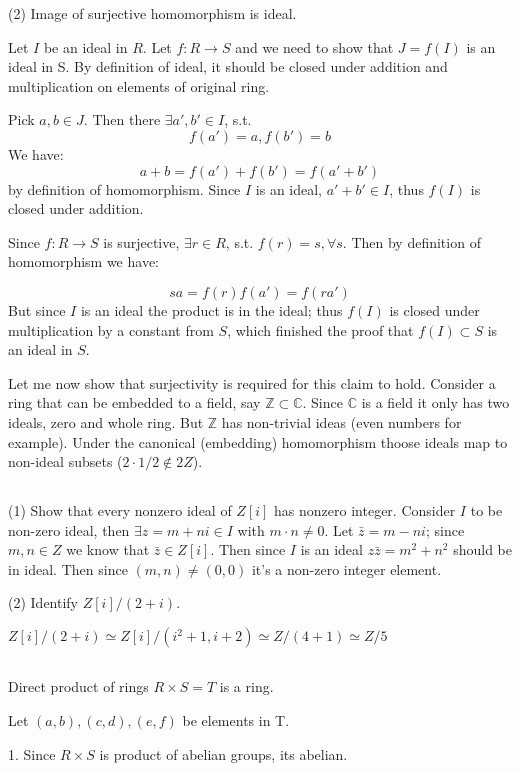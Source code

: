 \documentclass{amsart}
\def\Z{\mathbb{Z}}
\def\C{\mathbb{C}}
\begin{document}
(2) Image of surjective homomorphism is ideal.

Let $I$ be an ideal in $R$. Let $f: R \to S$ and we need to show that $J = f(I)$ is an ideal in S. By definition of ideal, it should be closed under addition and multiplication on elements of original ring.

Pick $a, b \in J$. Then there $\exists a', b' \in I$, s.t.
$$ f(a') = a, f(b') = b$$
We have:
$$a+b = f(a') + f(b') = f(a' +b')$$
by definition of homomorphism. Since $I$ is an ideal, $a' + b' \in I$, thus $f(I)$ is closed under addition.

Since $f: R \to S$ is surjective, $\exists r \in R$, s.t. $f(r) = s, \forall s$. Then by definition of homomorphism we have:

$$
    sa = f(r) f(a') = f(ra')
$$
But since $I$ is an ideal the product is in the ideal; thus $f(I)$ is closed under multiplication by a constant from $S$, which finished the proof that $f(I) \subset S$ is an ideal in $S$.

Let me now show that surjectivity is required for this claim to hold. Consider a ring that can be embedded to a field, say $\Z \subset \C$. Since $\C$ is a field it only has two ideals, zero and whole ring. But $\Z$ has non-trivial ideas (even numbers for example). Under the canonical (embedding) homomorphism thoose ideals map to non-ideal subsets ($2 \cdot 1/2 \notin 2Z$).

\subsection{} 
(1) Show that every nonzero ideal of $Z[i]$ has nonzero integer.
Consider $I$ to be non-zero ideal, then $\exists z = m + ni \in I$ with $m\cdot n \neq 0$. Let $\bar{z} = m-ni$; since $m,n \in Z$ we know that $\bar{z} \in Z[i]$. Then since $I$ is an ideal $z \bar{z} = m^2+n^2$ should be in ideal. Then since $(m,n) \neq (0,0)$ it's a non-zero integer element.

(2) Identify $Z[i] / (2+i)$. 

$Z[i]/(2+i) \simeq  Z[i]/(i^2+1, i+2) \simeq Z/(4+1) \simeq Z/5$

\subsection{}
Direct product of rings $R \times S = T$ is a ring.

Let $(a,b), (c,d), (e,f)$ be elements in T.

1. Since $R \times S$ is product of abelian groups, its abelian. 
\end{document}
